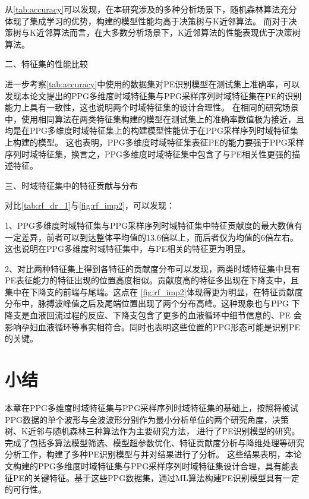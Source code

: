从\autoref{tab:accuracy}可以发现，在本研究涉及的多种分析场景下，随机森林算法充分体现了集成学习的优势，构建的模型性能均高于决策树与K近邻算法。
而对于决策树与K近邻算法而言，在大多数分析场景下，K近邻算法的性能表现优于决策树算法。

二、特征集的性能比较

进一步考察\autoref{tab:accuracy}中使用的数据集对PE识别模型在测试集上准确率，可以发现本论文提出的PPG多维度时域特征集与PPG采样序列时域特征集在PE的识别能力上具有一致性，这也说明两个时域特征集的设计合理性。
在相同的研究场景中，使用相同算法在两类特征集构建的模型在测试集上的准确率数值极为接近，且均是在PPG多维度时域特征集上的构建模型性能优于在PPG采样序列时域特征集上构建的模型。
这也表明，PPG多维度时域特征集表征PE的能力要强于PPG采样序列时域特征集，换言之，PPG多维度时域特征集中包含了与PE相关性更强的描述特征。

三、时域特征集中的特征贡献与分布

对比\autoref{tab:rf_dr_1}与\autoref{fig:rf_imp2}，可以发现：

1、PPG多维度时域特征集与PPG采样序列时域特征集中特征贡献度的最大数值有一定差异，前者可以到达整体平均值的13.6倍以上，而后者仅为均值的6倍左右。这也说明在PPG多维度时域特征集中，与PE相关的特征更为明显。

2、对比两种特征集上得到各特征的贡献度分布可以发现，两类时域特征集中具有PE表征能力的特征出现的位置高度相似。贡献度高的特征多出现在下降支中，且集中在下降支的前端与尾端。这点在
\autoref{fig:rf_imp2}体现得更为明显，在特征贡献度分布中，脉搏波峰值之后及尾端位置出现了两个分布高峰。这种现象也与PPG
下降支是血液回流过程的反应、下降支包含了更多的血液循环中细节信息的、PE
会影响孕妇血液循环等事实相符合。同时也表明这些位置的PPG形态可能是识别PE的关键。

\section{小结}
本章在PPG多维度时域特征集与PPG采样序列时域特征集的基础上，按照将被试PPG数据的单个波形与全波波形分别作为最小分析单位的两个研究角度，决策树、K近邻与随机森林三种算法作为主要研究方法，
进行了PE识别模型的研究。
完成了包括多算法模型筛选、模型超参数优化、特征贡献度分析与降维处理等研究分析工作，构建了多种PE识别模型与并对结果进行了分析。
这些结果表明，本论文构建的PPG多维度时域特征集与PPG采样序列时域特征集设计合理，具有能表征PE的关键特征。基于这些PPG数据集，通过ML算法构建PE识别模型具有一定的可行性。